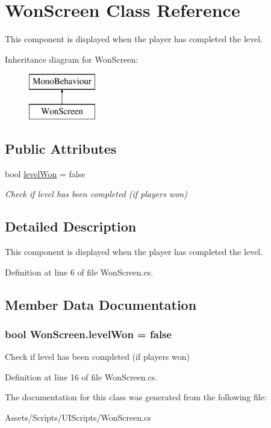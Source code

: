 \hypertarget{class_won_screen}{\section{Won\+Screen Class Reference}
\label{class_won_screen}
}


This component is displayed when the player has completed the level.  


Inheritance diagram for Won\+Screen\+:\begin{figure}[H]
\begin{center}
\leavevmode
\includegraphics[height=2.000000cm]{class_won_screen}
\end{center}
\end{figure}
\subsection*{Public Attributes}
\begin{DoxyCompactItemize}
\item 
bool \hyperlink{class_won_screen_a7ca2c2e5458d2753ed76b705d2f8c82d}{level\+Won} = false
\begin{DoxyCompactList}\small\item\em Check if level has been completed (if players won) \end{DoxyCompactList}\end{DoxyCompactItemize}


\subsection{Detailed Description}
This component is displayed when the player has completed the level. 



Definition at line 6 of file Won\+Screen.\+cs.



\subsection{Member Data Documentation}
\hypertarget{class_won_screen_a7ca2c2e5458d2753ed76b705d2f8c82d}{
\subsubsection[{level\+Won}]{\setlength{\rightskip}{0pt plus 5cm}bool Won\+Screen.\+level\+Won = false}}\label{class_won_screen_a7ca2c2e5458d2753ed76b705d2f8c82d}


Check if level has been completed (if players won) 



Definition at line 16 of file Won\+Screen.\+cs.



The documentation for this class was generated from the following file\+:\begin{DoxyCompactItemize}
\item 
Assets/\+Scripts/\+U\+I\+Scripts/Won\+Screen.\+cs\end{DoxyCompactItemize}
